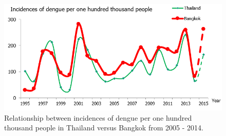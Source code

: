 \documentclass[review]{elsarticle}
\begin{document}
\begin{figure}[htbp]
	\begin{center}
		\includegraphics[width=140mm]{./figures/dengue_incident_rate}
		\caption{ Relationship between incidences of dengue per one hundred thousand people in Thailand versus Bangkok from 2005 - 2014.}
		\label{figure-dengue_incident_rate}
	\end{center}
\end{figure}


\end{document}

